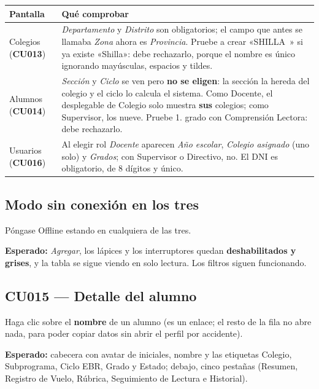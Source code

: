 \documentclass[11pt,a4paper]{article}
\newcommand{\cu}[1]{\textbf{CU#1}}
\begin{document}
\begin{center}
\begin{tabularx}{\textwidth}{lX}
\toprule
\textbf{Pantalla} & \textbf{Qué comprobar} \\
\midrule
Colegios (\cu{013}) & \emph{Departamento} y \emph{Distrito} son obligatorios; el campo que antes se llamaba \emph{Zona} ahora es \emph{Provincia}. Pruebe a crear «SHILLA~» si ya existe «Shilla»: debe rechazarlo, porque el nombre es único ignorando mayúsculas, espacios y tildes. \\
\addlinespace
Alumnos (\cu{014}) & \emph{Sección} y \emph{Ciclo} se ven pero \textbf{no se eligen}: la sección la hereda del colegio y el ciclo lo calcula el sistema. Como Docente, el desplegable de Colegio solo muestra \textbf{sus} colegios; como Supervisor, los nueve. Pruebe 1.\textordmasculine{} grado con Comprensión Lectora: debe rechazarlo. \\
\addlinespace
Usuarios (\cu{016}) & Al elegir rol \emph{Docente} aparecen \emph{Año escolar}, \emph{Colegio asignado} (uno solo) y \emph{Grados}; con Supervisor o Directivo, no. El DNI es obligatorio, de 8 dígitos y único. \\
\bottomrule
\end{tabularx}
\end{center}

\subsection{Modo sin conexión en los tres}

Póngase Offline estando en cualquiera de las tres.

\textbf{Esperado:} \emph{Agregar}, los lápices y los interruptores quedan
\textbf{deshabilitados y grises}, y la tabla se sigue viendo en solo lectura.
Los filtros siguen funcionando.

\subsection{CU015 --- Detalle del alumno}

Haga clic sobre el \textbf{nombre} de un alumno (es un enlace; el resto de la
fila no abre nada, para poder copiar datos sin abrir el perfil por accidente).

\textbf{Esperado:} cabecera con avatar de iniciales, nombre y las etiquetas
Colegio, Subprograma, Ciclo EBR, Grado y Estado; debajo, cinco pestañas
(Resumen, Registro de Vuelo, Rúbrica, Seguimiento de Lectura e Historial).
\end{document}
